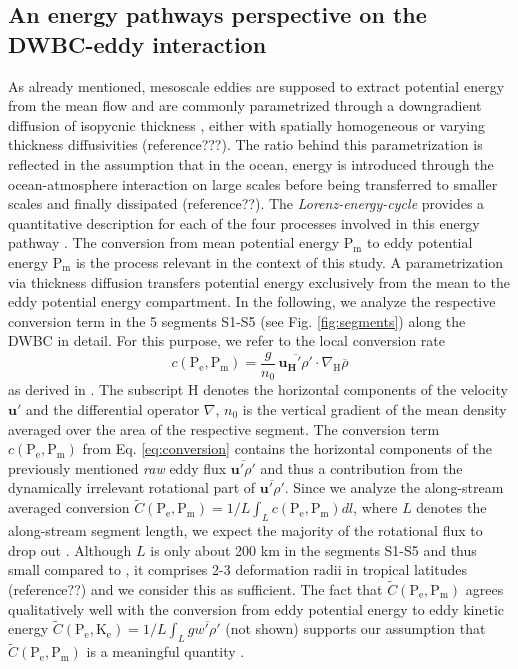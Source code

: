 \documentclass{ametsoc}
\begin{document}
\subsection{An energy pathways perspective on the DWBC-eddy interaction}
As already mentioned, mesoscale eddies are supposed to extract potential energy from the mean flow and are commonly parametrized through a downgradient diffusion of isopycnic thickness \citep{Gent1995}, either with spatially homogeneous or varying thickness diffusivities (reference???). The ratio behind this parametrization is reflected in the assumption that in the ocean, energy is introduced through the ocean-atmosphere interaction on large scales before being transferred to smaller scales and finally dissipated (reference??). The \textit{Lorenz-energy-cycle} provides a quantitative description for each of the four processes involved in this energy pathway \citep{Lorenz1955}. The conversion from mean potential energy $\text{P}_\text{m}$ to eddy potential energy $\text{P}_\text{m}$ is the process relevant in the context of this study. A parametrization via thickness diffusion transfers potential energy exclusively from the mean to the eddy potential energy compartment. In the following, we analyze the respective conversion term in the 5 segments S1-S5 (see Fig. \ref{fig:segments}) along the DWBC in detail. For this purpose, we refer to the local conversion rate
\begin{equation}
c(\text{P}_\text{e},\text{P}_\text{m}) = \frac{g}{n_0}\,\overline{\mathbf{u_\text{H}'}\rho'} \cdot \nabla_\text{H}\overline{\rho}
\label{eq:conversion}
\end{equation}
 as derived in \citet{Storch2012}. The subscript $\text{H}$ denotes the horizontal components of the velocity $\mathbf{u'}$ and the differential operator $\nabla$, $n_0$ is the vertical gradient of the mean density averaged over the area of the respective segment. The conversion term $c(\text{P}_\text{e},\text{P}_\text{m})$ from Eq. \eqref{eq:conversion} contains the horizontal components of the previously mentioned \textit{raw} eddy flux $\overline{\mathbf{u'}\rho'}$ and thus a contribution from the dynamically irrelevant rotational part of $\overline{\mathbf{u'}\rho'}$. Since we analyze the along-stream averaged conversion $\tilde{C}(\text{P}_\text{e},\text{P}_\text{m}) = 1/L \int_L c(\text{P}_\text{e},\text{P}_\text{m}) dl$, where $L$ denotes the along-stream segment length, we expect the majority of the rotational flux to drop out \citep{Abernathey2013, Griesel2014}. Although $L$ is only about 200 km in the segments S1-S5 and thus small compared to \citet{Griesel2014}, it comprises 2-3 deformation radii in tropical latitudes (reference??) and we consider this as sufficient. The fact that $\tilde{C}(\text{P}_\text{e},\text{P}_\text{m})$ agrees qualitatively well with the conversion from eddy potential energy to eddy kinetic energy $\tilde{C}(\text{P}_\text{e},\text{K}_\text{e}) = 1/L \int_L g\overline{w'\rho'}$ (not shown) supports our assumption that $\tilde{C}(\text{P}_\text{e},\text{P}_\text{m})$ is a meaningful quantity \citep{Eden2007}. \\
\end{document}
